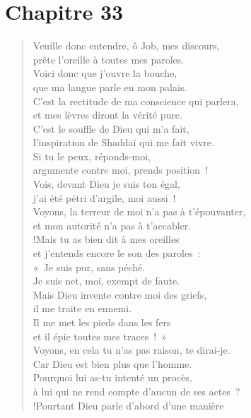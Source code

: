 \documentclass[french,twoside]{book} %
\def\mednobreak{\ifdim\lastskip<\medskipamount
  \removelastskip\nopagebreak\medskip\fi}
\newcommand{\labelblock}[1]{\medbreak{\noindent\color{rubric}\bfseries #1}\par\mednobreak}
\newcommand\chapteropen{} %
\newcommand\chaptercont{} %
\begin{document}
\chapteropen
\chapter[{Chapitre 33}]{Chapitre 33}\renewcommand{\leftmark}{Chapitre 33}


\chaptercont

\labelblock{L’intercesseur}


\begin{verse}
Veuille donc entendre, ô Job, mes discours, \\
prête l’oreille à toutes mes paroles.\\
Voici donc que j’ouvre la bouche, \\
que ma langue parle en mon palais.\\
C’est la rectitude de ma conscience qui parlera, \\
et mes lèvres diront la vérité pure.\\
C’est le souffle de Dieu qui m’a fait, \\
l’inspiration de Shaddaï qui me fait vivre.\\
Si tu le peux, réponds-moi, \\
argumente contre moi, prends position !\\
Vois, devant Dieu je suis ton égal, \\
j’ai été pétri d’argile, moi aussi !\\
Voyons, la terreur de moi n’a pas à t’épouvanter, \\
et mon autorité n’a pas à t’accabler.\\!Mais tu as bien dit à mes oreilles \\
et j’entends encore le son des paroles :\\
« Je suis pur, sans péché. \\
Je suis net, moi, exempt de faute.\\
Mais Dieu invente contre moi des griefs, \\
il me traite en ennemi.\\
Il me met les pieds dans les fers \\
et il épie toutes mes traces ! »\\
Voyons, en cela tu n’as pas raison, te dirai-je. \\
Car Dieu est bien plus que l’homme.\\
Pourquoi lui as-tu intenté un procès, \\
à lui qui ne rend compte d’aucun de ses actes ?\\!Pourtant Dieu parle d’abord d’une manière \\

\end{verse}
\end{document}
